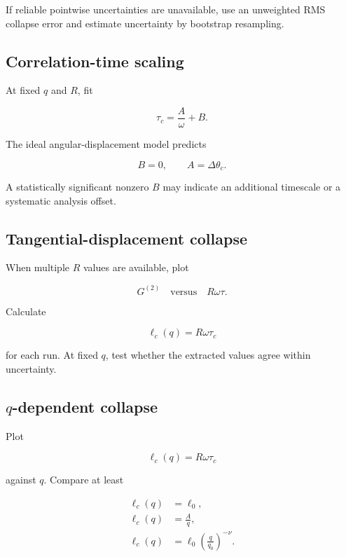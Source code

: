 \documentclass[11pt,letterpaper]{article}
\newcommand{\Gnorm}{G^{(2)}}
\begin{document}
If reliable pointwise uncertainties are unavailable, use an unweighted RMS
collapse error and estimate uncertainty by bootstrap resampling.

\subsection{Correlation-time scaling}

At fixed $q$ and $R$, fit

\begin{equation}
    \tau_c=\frac{A}{\omega}+B.
\end{equation}

The ideal angular-displacement model predicts

\begin{equation}
    B=0,
    \qquad
    A=\Delta\theta_c.
\end{equation}

A statistically significant nonzero $B$ may indicate an additional
timescale or a systematic analysis offset.

\subsection{Tangential-displacement collapse}

When multiple $R$ values are available, plot

\begin{equation}
    \Gnorm
    \quad \text{versus} \quad
    R\omega\tau.
\end{equation}

Calculate

\begin{equation}
    \ell_c(q)=R\omega\tau_c
\end{equation}

for each run. At fixed $q$, test whether the extracted values agree within
uncertainty.

\subsection{\texorpdfstring{$q$}{q}-dependent collapse}

Plot

\begin{equation}
    \ell_c(q)=R\omega\tau_c
\end{equation}

against $q$. Compare at least

\begin{align}
    \ell_c(q)&=\ell_0,\\
    \ell_c(q)&=\frac{A}{q},\\
    \ell_c(q)&=\ell_0\left(\frac{q}{q_0}\right)^{-\nu}.
\end{align}
\end{document}

